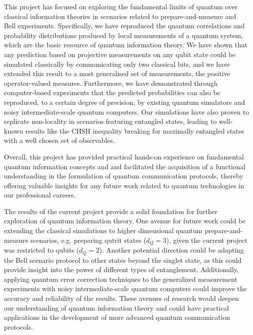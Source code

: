 This project has focused on exploring the fundamental limits of quantum over classical information theories in scenarios related to prepare-and-measure and Bell experiments. Specifically, we have reproduced the quantum correlations and probability distributions produced by local measurements of a quantum system, which are the basic resource of quantum information theory. We have shown that any prediction based on projective measurements on any qubit state could be simulated classically by communicating only two classical bits, and we have extended this result to a most generalised set of measurements, the positive operator-valued measures. Furthermore, we have demonstrated through computer-based experiments that the predicted probabilities can also be reproduced, to a certain degree of precision, by existing quantum simulators and noisy intermediate-scale quantum computers. Our simulations have also proven to replicate non-locality in scenarios featuring entangled states, leading to well-known results like the CHSH inequality breaking for maximally entangled states with a well chosen set of observables. 

Overall, this project has provided practical hands-on experience on fundamental quantum information concepts and and facilitated the acquisition of a functional understanding in the formulation of quantum communication protocols, thereby offering valuable insights for any future work related to quantum technologies in our professional careers.


The results of the current project provide a solid foundation for further exploration of quantum information theory. One avenue for future work could be extending the classical simulations to higher dimensional quantum prepare-and-measure scenarios, e.g. preparing qutrit states ($d_Q = 3$), given the current project was restricted to qubits ($d_Q = 2$). Another potential direction could be adapting the Bell scenario protocol to other states beyond the singlet state, as this could provide insight into the power of different types of entanglement. Additionally, applying quantum error correction techniques to the generalized measurement experiments with noisy intermediate-scale quantum computers could improve the accuracy and reliability of the results. These avenues of research would deepen our understanding of quantum information theory and could have practical applications in the development of more advanced quantum communication protocols.
